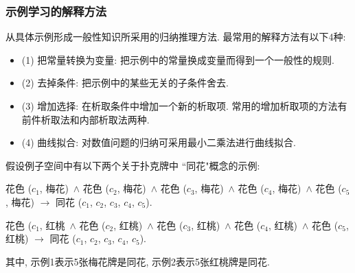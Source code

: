 \subsubsection{示例学习的解释方法}
    从具体示例形成一般性知识所采用的归纳推理方法. 最常用的解释方法有以下4种:
\begin{itemize}
\item (1) 把常量转换为变量: 把示例中的常量换成变量而得到一个一般性的规则.

\item (2) 去掉条件: 把示例中的某些无关的子条件舍去.

\item (3) 增加选择: 在析取条件中增加一个新的析取项. 常用的增加析取项的方法有前件析取法和内部析取法两种.

\item (4) 曲线拟合: 对数值问题的归纳可采用最小二乘法进行曲线拟合.
\end{itemize}
\begin{example}
假设例子空间中有以下两个关于扑克牌中 ``同花"概念的示例:

 花色 ($c_1$, 梅花)\, $\wedge$ 花色 ($c_2$, 梅花)\, $\wedge$ 花色 ($c_3$, 梅花)\, $\wedge$ 花色 ($c_4$, 梅花)\, $\wedge$ 花色 ($c_5$, 梅花) $\rightarrow$ 同花 ($c_1$, $c_2$, $c_3$, $c_4$, $c_5$).

 花色 ($c_1$, 红桃\, $\wedge$ 花色 ($c_2$, 红桃)\, $\wedge$ 花色 ($c_3$, 红桃)\, $\wedge$ 花色 ($c_4$, 红桃)\, $\wedge$ 花色 ($c_5$, 红桃) $\rightarrow$ 同花 ($c_1$, $c_2$, $c_3$, $c_4$, $c_5$).
\end{example}
其中, 示例1表示5张梅花牌是同花, 示例2表示5张红桃牌是同花.

